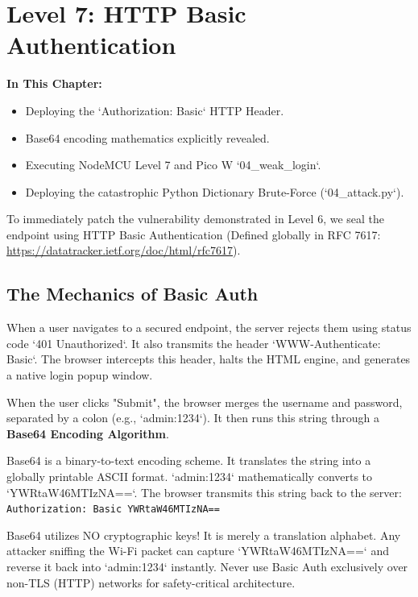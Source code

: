 \chapter{Level 7: HTTP Basic Authentication}

\textbf{In This Chapter:}
\begin{itemize}
    \item Deploying the `Authorization: Basic` HTTP Header.
    \item Base64 encoding mathematics explicitly revealed.
    \item Executing NodeMCU Level 7 and Pico W `04\_weak\_login`.
    \item Deploying the catastrophic Python Dictionary Brute-Force (`04\_attack.py`).
\end{itemize}

To immediately patch the vulnerability demonstrated in Level 6, we seal the endpoint using HTTP Basic Authentication (Defined globally in RFC 7617: \url{https://datatracker.ietf.org/doc/html/rfc7617}). 

\section{The Mechanics of Basic Auth}
When a user navigates to a secured endpoint, the server rejects them using status code `401 Unauthorized`. It also transmits the header `WWW-Authenticate: Basic`. The browser intercepts this header, halts the HTML engine, and generates a native login popup window.

When the user clicks "Submit", the browser merges the username and password, separated by a colon (e.g., `admin:1234`). It then runs this string through a \textbf{Base64 Encoding Algorithm}. 

Base64 is a binary-to-text encoding scheme. It translates the string into a globally printable ASCII format. `admin:1234` mathematically converts to `YWRtaW46MTIzNA==`. The browser transmits this string back to the server:
\texttt{Authorization: Basic YWRtaW46MTIzNA==}

\begin{troubleshootbox}
Base64 utilizes NO cryptographic keys! It is merely a translation alphabet. Any attacker sniffing the Wi-Fi packet can capture `YWRtaW46MTIzNA==` and reverse it back into `admin:1234` instantly. Never use Basic Auth exclusively over non-TLS (HTTP) networks for safety-critical architecture.
\end{troubleshootbox}

